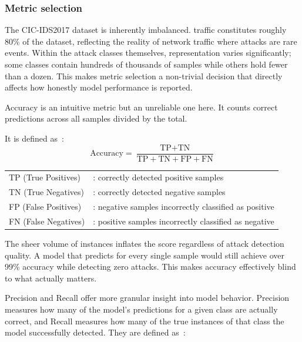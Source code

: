 \subsubsection{Metric selection}

The CIC-IDS2017 dataset is inherently imbalanced.
 traffic constitutes roughly 80\% of the dataset, reflecting the reality of network traffic where attacks are rare events.
Within the attack classes themselves, representation varies significantly; some classes contain hundreds of thousands of samples while others hold fewer than a dozen.
This makes metric selection a non-trivial decision that directly affects how honestly model performance is reported.

Accuracy is an intuitive metric but an unreliable one here.
It counts correct predictions across all samples divided by the total. 

\vspace{1cm}
It is defined as~\cite{powers2011evaluation}:
\vspace{0.4cm}
\begin{equation*}
    \label{eq:accuracy}
    \text{Accuracy} = \frac{\text{TP} + \text{TN}}{\text{TP} + \text{TN} + \text{FP} + \text{FN}}
\end{equation*}

\begin{tabular}{ll}
    TP (True Positives)  & : correctly detected positive samples                 \\
    TN (True Negatives)  & : correctly detected negative samples                 \\
    FP (False Positives) & : negative samples incorrectly classified as positive \\
    FN (False Negatives) & : positive samples incorrectly classified as negative \\
\end{tabular}
\vspace{0.3cm}

The sheer volume of  instances inflates the score regardless of attack detection quality. A model that predicts  for every single sample would still achieve over 99\% accuracy while detecting zero attacks.
This makes accuracy effectively blind to what actually matters.

Precision and Recall offer more granular insight into model behavior.
Precision measures how many of the model's predictions for a given class are actually correct, and Recall measures how many of the true instances of that class the model successfully detected. They are defined as~\cite{powers2011evaluation, manning2008introduction}:

